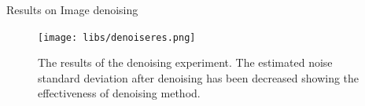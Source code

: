 \documentclass{libs/ufc_format}
\begin{document}



\begin{frame}{\small Results on Image denoising}
    \begin{figure}
        \texttt{[image: libs/denoiseres.png]}
        \caption{The results of the denoising experiment. The estimated noise standard deviation after denoising has been decreased showing the effectiveness of denoising method.}
    \end{figure}
\end{frame}
\end{document}
